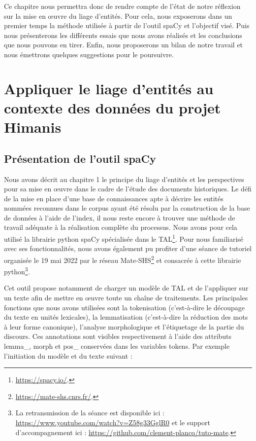 \documentclass[a4paper,12pt,twoside]{book}
\begin{document}
	Ce chapitre nous permettra donc de rendre compte de l'état de notre réflexion sur la mise en œuvre du liage d'entités. Pour cela, nous exposerons dans un premier temps la méthode utilisée à partir de l'outil spaCy et l'objectif visé. Puis nous présenterons les différents essais que nous avons réalisés et les conclusions que nous pouvons en tirer. Enfin, nous proposerons un bilan de notre travail et nous émettrons quelques suggestions pour le poursuivre.
	
	\section{Appliquer le liage d'entités au contexte des données du projet Himanis}
	
	\subsection{Présentation de l'outil spaCy}
	
	Nous avons décrit au chapitre 1 le principe du liage d'entités et les perspectives pour sa mise en œuvre dans le cadre de l'étude des documents historiques. Le défi de la mise en place d'une base de connaissances apte à décrire les entités nommées reconnues dans le corpus ayant été résolu par la construction de la base de données à l'aide de l'index, il nous reste encore à trouver une méthode de travail adéquate à la réalisation complète du processus. Nous avons pour cela utilisé la librairie python spaCy spécialisée dans le TAL\footnote{\url{https://spacy.io/}.}. Pour nous familiarisé avec ses fonctionnalités, nous avons également pu profiter d'une séance de tutoriel organisée le 19 mai 2022 par le réseau Mate-SHS\footnote{\url{https://mate-shs.cnrs.fr/}.} et consacrée à cette librairie python\footnote{La retransmission de la séance est disponible ici : \url{https://www.youtube.com/watch?v=Z58g33GglR0} et le support d'accompagnement ici : \url{https://github.com/clement-plancq/tuto-mate}.}.
	
	Cet outil propose notamment de charger un modèle de TAL et de l'appliquer sur un texte afin de mettre en œuvre toute un chaîne de traitements. Les principales fonctions que nous avons utilisées sont la tokenisation (c'est-à-dire le découpage du texte en unités lexicales), la lemmatisation (c'est-à-dire la réduction des mots à leur forme canonique), l'analyse morphologique et l'étiquetage de la partie du discours. Ces annotations sont visibles respectivement à l'aide des attributs \og lemma\_\fg{}, \og morph\fg{} et \og pos\_\fg{} conservées dans les variables tokens. Par exemple l'initiation du modèle et du texte suivant :
	
\end{document}
